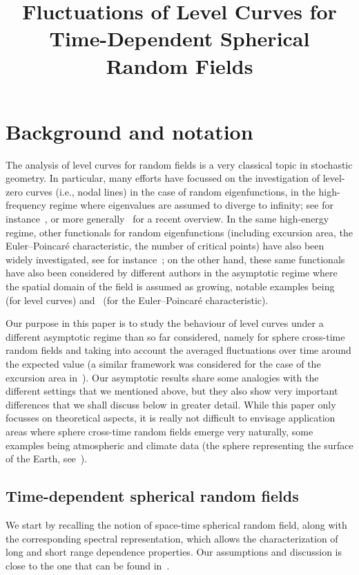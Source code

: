 \documentclass[AHL,Unicode,longabstracts,published]{cedram}
\title[Level curves of sphere-cross-time random fields]{Fluctuations of Level Curves for Time-Dependent Spherical Random Fields}
\author[\initial{D.} \lastname{Marinucci}]{\firstname{Domenico} \lastname{Marinucci}}
\author[\initial{M.} \lastname{Rossi}]{\firstname{Maurizia} \lastname{Rossi}}
\author[\initial{A.} \lastname{Vidotto}]{\firstname{Anna} \lastname{Vidotto}}
\begin{document}
\maketitle

\section{Background and notation}

The analysis of level curves for random fields is a very classical topic in stochastic geometry. In particular, many efforts have focussed on the investigation of level-zero curves (i.e., nodal lines) in the case of random eigenfunctions, in the high-frequency regime where eigenvalues are assumed to diverge to infinity; see for instance~\cite{MPRW16, NPR19, PV20,Wig}, or more generally~\cite{Wig22} for a recent overview. In the same high-energy regime, other functionals for random eigenfunctions (including excursion area, the Euler--Poincaré characteristic, the number of critical points) have also been widely investigated, see for instance~\cite {M2022}; on the other hand, these same functionals have also been considered by different authors in the asymptotic regime where the spatial domain of the field is assumed as growing, notable examples being~\cite{KL01} (for level curves) and~\cite{EL2016} (for the Euler--Poincaré characteristic).

Our purpose in this paper is to study the behaviour of level curves under a different asymptotic regime than so far considered, namely for sphere cross-time random fields and taking into account the averaged fluctuations over time around the expected value (a similar framework was considered for the case of the excursion area in~\cite{MRV:20}). Our asymptotic results share some analogies with the different settings that we mentioned above, but they also show very important differences that we shall discuss below in greater detail. While this paper only focusses on theoretical aspects, it is really not difficult to envisage application areas where sphere cross-time random fields emerge very naturally, some examples being atmospheric and climate data (the sphere representing the surface of the Earth, see~\cite {Ch:17}).

\subsection{Time-dependent spherical random fields}

We start by recalling the notion of space-time spherical random field, along with the corresponding spectral representation, which allows the characterization of long and short range dependence properties. Our assumptions and discussion is close to the one that can be found in~\cite {MRV:20}.
\end{document}

